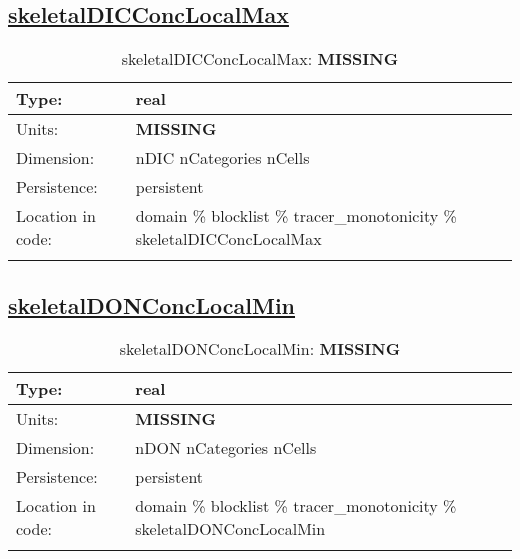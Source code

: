 \subsection[skeletalDICConcLocalMax]{\hyperref[sec:var_tab_tracer_monotonicity]{skeletalDICConcLocalMax}}
\label{subsec:var_sec_tracer_monotonicity_skeletalDICConcLocalMax}
\begin{center}
\begin{longtable}{| p{2.0in} | p{4.0in} |}
        \hline 
        Type: & real \\
        \hline 
        Units: & {\bf \color{red} MISSING} \\
        \hline 
        Dimension: & nDIC nCategories nCells \\
        \hline 
        Persistence: & persistent \\
        \hline 
         Location in code: & domain \% blocklist \% tracer\_monotonicity \% skeletalDICConcLocalMax \\
         \hline 
    \caption{skeletalDICConcLocalMax: {\bf \color{red} MISSING}}
\end{longtable}
\end{center}
\subsection[skeletalDONConcLocalMin]{\hyperref[sec:var_tab_tracer_monotonicity]{skeletalDONConcLocalMin}}
\label{subsec:var_sec_tracer_monotonicity_skeletalDONConcLocalMin}
\begin{center}
\begin{longtable}{| p{2.0in} | p{4.0in} |}
        \hline 
        Type: & real \\
        \hline 
        Units: & {\bf \color{red} MISSING} \\
        \hline 
        Dimension: & nDON nCategories nCells \\
        \hline 
        Persistence: & persistent \\
        \hline 
         Location in code: & domain \% blocklist \% tracer\_monotonicity \% skeletalDONConcLocalMin \\
         \hline 
    \caption{skeletalDONConcLocalMin: {\bf \color{red} MISSING}}
\end{longtable}
\end{center}

